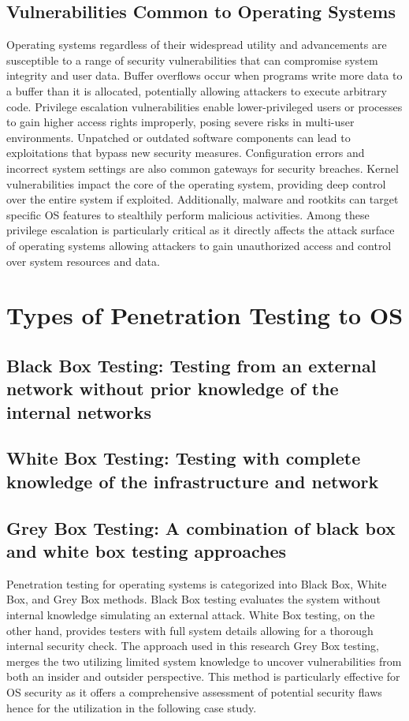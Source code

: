 \documentclass[manuscript,acmsmall,anonymous,review,screen,nonacm=true, authorversion=true]{acmart}
\begin{document}
\subsection{Vulnerabilities Common to Operating Systems}
Operating systems regardless of their widespread utility and advancements are susceptible to a range of security vulnerabilities that can compromise system integrity and user data. Buffer overflows occur when programs write more data to a buffer than it is allocated, potentially allowing attackers to execute arbitrary code. Privilege escalation vulnerabilities enable lower-privileged users or processes to gain higher access rights improperly, posing severe risks in multi-user environments. Unpatched or outdated software components can lead to exploitations that bypass new security measures. Configuration errors and incorrect system settings are also common gateways for security breaches. Kernel vulnerabilities impact the core of the operating system, providing deep control over the entire system if exploited. Additionally, malware and rootkits can target specific OS features to stealthily perform malicious activities. Among these privilege escalation is particularly critical as it directly affects the attack surface of operating systems allowing attackers to gain unauthorized access and control over system resources and data.

\section{Types of Penetration Testing to OS}

\subsection{Black Box Testing: Testing from an external network without prior knowledge of the internal networks}
\subsection{White Box Testing: Testing with complete knowledge of the infrastructure and network}
\subsection{Grey Box Testing: A combination of black box and white box testing approaches}
Penetration testing for operating systems is categorized into Black Box, White Box, and Grey Box methods. Black Box testing evaluates the system without internal knowledge simulating an external attack. White Box testing, on the other hand, provides testers with full system details allowing for a thorough internal security check. The approach used in this research Grey Box testing, merges the two utilizing limited system knowledge to uncover vulnerabilities from both an insider and outsider perspective. This method is particularly effective for OS security as it offers a comprehensive assessment of potential security flaws hence for the utilization in the following case study.
\end{document}

